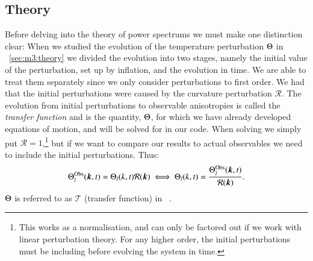 \subsection{Theory}\label{sec:m4:theory}
    Before delving into the theory of power spectrums we must make one distinction clear: When we studied the evolution of the temperature perturbation $\Theta$ in ~\cref{sec:m3:theory} we divided the evolution into two stages, namely the initial value of the perturbation, set up by inflation, and the evolution in time. We are able to treat them separately since we only consider perturbations to first order. We had that the initial perturbations were caused by the curvature perturbation $\mathcal{R}$. The evolution from initial perturbations to observable anisotropies is called the \textit{transfer function} and is the quantity, $\Theta$, for which we have already developed equations of motion, and will be solved for in our code. When solving we simply put $\mathcal{R}=1$,\footnote{This works as a normalisation, and can only be factored out if we work with linear perturbation theory. For any higher order, the initial perturbations must be including before evolving the system in time.} but if we want to compare our results to actual observables we need to include the initial perturbations. Thus:
    \begin{equation}
        \Theta^\mathrm{Obs}_l(\boldsymbol{k},t) = \Theta_l(k,t)\mathcal{R}(\boldsymbol{k}) \iff \Theta_l(k,t)=\frac{\Theta^\mathrm{Obs}_l(\boldsymbol{k},t)}{\mathcal{R}(\boldsymbol{k})}.
    \end{equation}
    $\Theta$ is referred to as $\mathcal{T}$ (transfer function) in ~\cite{dodelson2020modern}.
